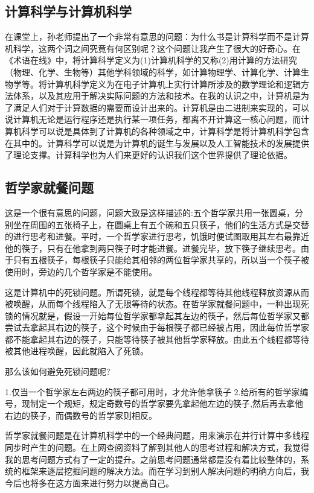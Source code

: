 \documentclass{article}
\begin{document}
\subsection{计算科学与计算机科学}
在课堂上，孙老师提出了一个非常有意思的问题：为什么书是计算科学而不是计算机科学，这两个词之间究竟有何区别呢？这个问题让我产生了很大的好奇心。在《术语在线》\citep{termonline}中，将计算科学定义为(1)计算机科学的又称(2)用计算的方法研究（物理、化学、生物等）其他学科领域的科学，如计算物理学、计算化学、计算生物学等。将计算机科学定义为在电子计算机上实行计算所涉及的数学理论和逻辑方法体系，以及其应用于解决实际问题的方法和技术。在我的认识之中，计算机是为了满足人们对于计算数据的需要而设计出来的。计算机是由二进制来实现的，可以说计算机无论是运行程序还是执行某一项任务，都离不开计算这一核心问题，而计算机科学可以说是具体到了计算机的各种领域之中，计算科学是将计算机科学包含在其中的。计算科学可以说是为计算机的诞生与发展以及人工智能技术的发展提供了理论支撑。计算科学也为人们来更好的认识我们这个世界提供了理论依据。

\subsection{哲学家就餐问题}
这是一个很有意思的问题，问题大致是这样描述的:五个哲学家共用一张圆桌，分别坐在周围的五张椅子上，在圆桌上有五个碗和五只筷子，他们的生活方式是交替的进行思考和进餐。平时，一个哲学家进行思考，饥饿时便试图取用其左右最靠近他的筷子，只有在他拿到两只筷子时才能进餐。进餐完毕，放下筷子继续思考。由于只有五根筷子，每根筷子只能给其相邻的两位哲学家共享的，所以当一个筷子被使用时，旁边的几个哲学家是不能使用。\par
这是计算机中的死锁问题。所谓死锁，就是每个线程都等待其他线程释放资源从而被唤醒，从而每个线程陷入了无限等待的状态。在哲学家就餐问题中，一种出现死锁的情况就是，假设一开始每位哲学家都拿起其左边的筷子，然后每位哲学家又都尝试去拿起其右边的筷子，这个时候由于每根筷子都已经被占用，因此每位哲学家都不能拿起其右边的筷子，只能等待筷子被其他哲学家释放。由此五个线程都等待被其他进程唤醒，因此就陷入了死锁。\par
那么该如何避免死锁问题呢?\par
1.仅当一个哲学家左右两边的筷子都可用时，才允许他拿筷子
2.给所有的哲学家编号，现制定一个规矩，规定奇数号的哲学家要先拿起他左边的筷子,然后再去拿他右边的筷子，而偶数号的哲学家则相反。\par
哲学家就餐问题是在计算机科学中的一个经典问题，用来演示在并行计算中多线程同步时产生的问题。在上网查阅资料了解到其他人的思考过程和解决方式，我觉得我的思考问题方式有了一定的提升。之前思考问题通常都是没有着比较整体的，系统的框架来逐层挖掘问题的解决方法。而在学习到别人解决问题的明确方向后，我今后也将多在这方面来进行努力以提高自己。
\end{document}
